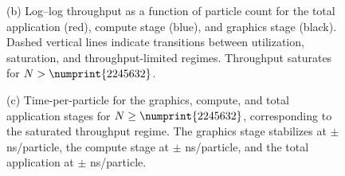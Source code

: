 \begin{figure}[ht]
{(b) Log--log throughput as a function of particle count for the total
application (red), compute stage (blue), and graphics stage (black).
Dashed vertical lines indicate transitions between utilization,
saturation, and throughput-limited regimes. Throughput saturates for
$N>\numprint{\APQBRTIMEPERPALLstartval{}}$.

(c) Time-per-particle for the graphics, compute, and total application
stages for $N\geq\numprint{\APQBRTIMEPERPALLstartval{}}$, corresponding
to the saturated throughput regime. The graphics stage stabilizes at
\APQBRTIMEPERPALLGraphicsstabilzes{}$\pm$\APQBRTIMEPERPALLGraphicsstdval{}
ns/particle, the compute stage at
\APQBRTIMEPERPALLComputestabilzes{}$\pm$\APQBRTIMEPERPALLComputestdval{}
ns/particle, and the total application at
\APQBRTIMEPERPALLTotalstabilzes{}$\pm$\APQBRTIMEPERPALLTotalstdval{}
ns/particle.}
\label{fig:A_PQBR_THROUGHPUT_AND_TPP}
\end{figure}
\endgroup